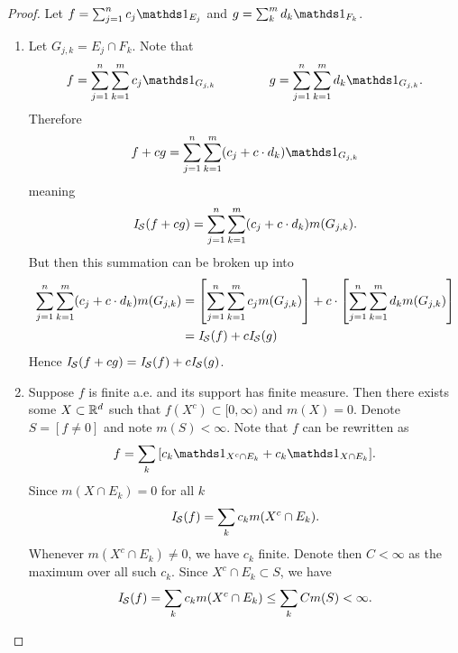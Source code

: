 \documentclass[hw_all.tex]{subfiles}
\begin{document}
\begin{proof}
    Let $f = \sum_{j=1}^n c_j \ind{E_j}$ and $g = \sum_k^m d_k \ind{F_k}$.
    \begin{enumerate}
        \item
            Let $G_{j,k} = E_j \cap F_k$. Note that
            \[
                f = \sum_{j=1}^n \sum_{k=1}^m c_j \ind{G_{j,k}} \hspace{1.5cm} g = \sum_{j=1}^n \sum_{k=1}^m d_k \ind{G_{j,k}}
            .\]
            Therefore
            \[
                f + cg = \sum_{j = 1}^n \sum_{k = 1}^m (c_j + c \cdot d_k) \ind{G_{j,k}}
            \]
            meaning
            \[
                \mathit{I}_{\mathcal{S}}(f + cg) = \sum_{j=1}^n \sum_{k=1}^m (c_j + c \cdot d_k) m(G_{j,k})
            .\]
            But then this summation can be broken up into
            \begin{align*}
                \sum_{j=1}^n \sum_{k=1}^m (c_j + c \cdot d_k) m(G_{j,k}) &= \qty[\sum_{j=1}^n \sum_{k=1}^m c_j m(G_{j,k})] + c \cdot \qty[\sum_{j=1}^n \sum_{k=1}^m d_k m(G_{j,k})] \\
                &= \mathit{I}_{\mathcal{S}}(f) + c \mathit{I}_{\mathcal{S}}(g)
            \end{align*}
            Hence $\mathit{I}_{\mathcal{S}}(f + cg) = \mathit{I}_{\mathcal{S}}(f) + c\mathit{I}_{\mathcal{S}}(g)$.
            
        \item
            Suppose $f$ is finite a.e. and its support has finite measure. Then there exists some $X \subset \mathbb{R}^d$ such that $f(X^c) \subset [0,\infty)$ and $m(X) = 0$. Denote $S = [f \neq 0]$ and note $m(S) < \infty$. Note that $f$ can be rewritten as
            \[
                f = \sum_{k} \qty[c_k \ind{X^c \cap E_k} + c_k \ind{X \cap E_k}]
            .\]
            Since $m(X \cap E_k) = 0$ for all $k$
            \[
                \mathit{I}_{\mathcal{S}}(f) = \sum_{k} c_k m(X^c \cap E_k)
            .\]
            Whenever $m(X^c \cap E_k) \neq 0$, we have $c_k$ finite. Denote then $C < \infty$ as the maximum over all such $c_k$. Since $X^c \cap E_k \subset S$, we have
            \[
                \mathit{I}_{\mathcal{S}}(f) = \sum_{k} c_k m(X^c \cap E_k) \leq \sum_{k} C m(S) < \infty
            .\]


\end{enumerate}
\end{proof}
\end{document}

